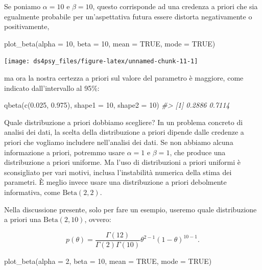\documentclass[
  11pt,
]{krantz}
\makeatletter
\newenvironment{Shaded}{\begin{snugshade}}{\end{snugshade}}
\newcommand{\AttributeTok}[1]{\textcolor[rgb]{0.61,0.61,0.61}{#1}}
\newcommand{\CommentTok}[1]{\textcolor[rgb]{0.37,0.37,0.37}{\textit{#1}}}
\newcommand{\ConstantTok}[1]{\textcolor[rgb]{0,0,0}{#1}}
\newcommand{\DecValTok}[1]{\textcolor[rgb]{0.06,0.06,0.06}{#1}}
\newcommand{\FloatTok}[1]{\textcolor[rgb]{0.06,0.06,0.06}{#1}}
\newcommand{\FunctionTok}[1]{\textcolor[rgb]{0,0,0}{#1}}
\newcommand{\NormalTok}[1]{#1}
\newenvironment{kframe}{%
\medskip{}
\setlength{\fboxsep}{.8em}
 \def\at@end@of@kframe{}%
 \ifinner\ifhmode%
  \def\at@end@of@kframe{\end{minipage}}%
  \begin{minipage}{\columnwidth}%
 \fi\fi%
 \def\FrameCommand##1{\hskip\@totalleftmargin \hskip-\fboxsep
 \colorbox{shadecolor}{##1}\hskip-\fboxsep
     \hskip-\linewidth \hskip-\@totalleftmargin \hskip\columnwidth}%
 \MakeFramed {\advance\hsize-\width
   \@totalleftmargin\z@ \linewidth\hsize
   \@setminipage}}%
 {\par\unskip\endMakeFramed%
 \at@end@of@kframe}
\renewenvironment{Shaded}{\begin{kframe}}{\end{kframe}}
\theoremstyle{definition}
\theoremstyle{definition}
\theoremstyle{definition}
\theoremstyle{definition}
\theoremstyle{remark}
\makeatother
\begin{document}
Se poniamo \(\alpha=10\) e \(\beta=10\), questo corrisponde ad una credenza a priori che sia egualmente probabile per un'aspettativa futura essere distorta negativamente o positivamente,

\begin{Shaded}
\begin{Highlighting}[]
\FunctionTok{plot\_beta}\NormalTok{(}\AttributeTok{alpha =} \DecValTok{10}\NormalTok{, }\AttributeTok{beta =} \DecValTok{10}\NormalTok{, }\AttributeTok{mean =} \ConstantTok{TRUE}\NormalTok{, }\AttributeTok{mode =} \ConstantTok{TRUE}\NormalTok{)}
\end{Highlighting}
\end{Shaded}

\begin{center}\texttt{[image: ds4psy\_files/figure-latex/unnamed-chunk-11-1]} \end{center}

ma ora la nostra certezza a priori sul valore del parametro è maggiore, come indicato dall'intervallo al 95\%:

\begin{Shaded}
\begin{Highlighting}[]
\FunctionTok{qbeta}\NormalTok{(}\FunctionTok{c}\NormalTok{(}\FloatTok{0.025}\NormalTok{, }\FloatTok{0.975}\NormalTok{), }\AttributeTok{shape1 =} \DecValTok{10}\NormalTok{, }\AttributeTok{shape2 =} \DecValTok{10}\NormalTok{)}
\CommentTok{\#\textgreater{} [1] 0.2886 0.7114}
\end{Highlighting}
\end{Shaded}

Quale distribuzione a priori dobbiamo scegliere? In un problema concreto di analisi dei dati, la scelta della distribuzione a priori dipende dalle credenze a priori che vogliamo includere nell'analisi dei dati. Se non abbiamo alcuna informazione a priori, potremmo usare \(\alpha=1\) e \(\beta=1\), che produce una distribuzione a priori uniforme. Ma l'uso di distribuzioni a priori uniformi è sconsigliato per vari motivi, inclusa l'instabilità numerica della stima dei parametri. È meglio invece usare una distribuzione a priori debolmente informativa, come \(\mbox{Beta}(2, 2)\).

Nella discussione presente, solo per fare un esempio, useremo quale distribuzione a priori una \(\mbox{Beta}(2, 10)\), ovvero:

\[
p(\theta) = \frac{\Gamma(12)}{\Gamma(2)\Gamma(10)}\theta^{2-1} (1-\theta)^{10-1}.
\]

\begin{Shaded}
\begin{Highlighting}[]
\FunctionTok{plot\_beta}\NormalTok{(}\AttributeTok{alpha =} \DecValTok{2}\NormalTok{, }\AttributeTok{beta =} \DecValTok{10}\NormalTok{, }\AttributeTok{mean =} \ConstantTok{TRUE}\NormalTok{, }\AttributeTok{mode =} \ConstantTok{TRUE}\NormalTok{)}
\end{Highlighting}
\end{Shaded}
\end{document}
